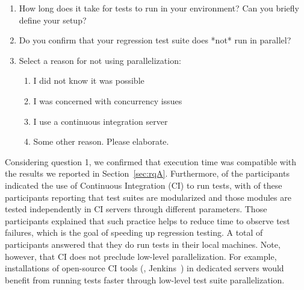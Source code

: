\begin{enumerate}
\item How long does it take for tests to run in your environment? Can
  you briefly define your setup?
\item Do you confirm that your regression test suite does *not* run in parallel?
\item\label{questionThree} Select a reason for not using parallelization:
  \begin{enumerate}[label=\alph*)]
  \item I did not know it was possible
  \item I was concerned with concurrency issues
  \item I use a continuous integration server
  \item Some other reason. Please elaborate.
  \end{enumerate}
\end{enumerate}

Considering question 1, we confirmed that execution time was
compatible with the results we reported in Section~\ref{sec:rqA}.
Furthermore, \emailsCI{} of the participants indicated the use of
Continuous Integration (CI) to run tests, with \emailsDistributed{} of
these participants reporting that test suites are modularized and
those modules are tested independently in CI servers through different
parameters.  Those participants explained that such practice helps to
reduce time to observe test failures, which is the goal of speeding up
regression testing.  A total of \emailsLocal{} participants answered
that they do run tests in their local machines.  Note, however, that
CI does not preclude low-level parallelization.  For example,
installations of open-source CI tools (\eg{}, Jenkins~\cite{jenkins})
in dedicated servers would benefit from running tests faster through
low-level test suite parallelization.


